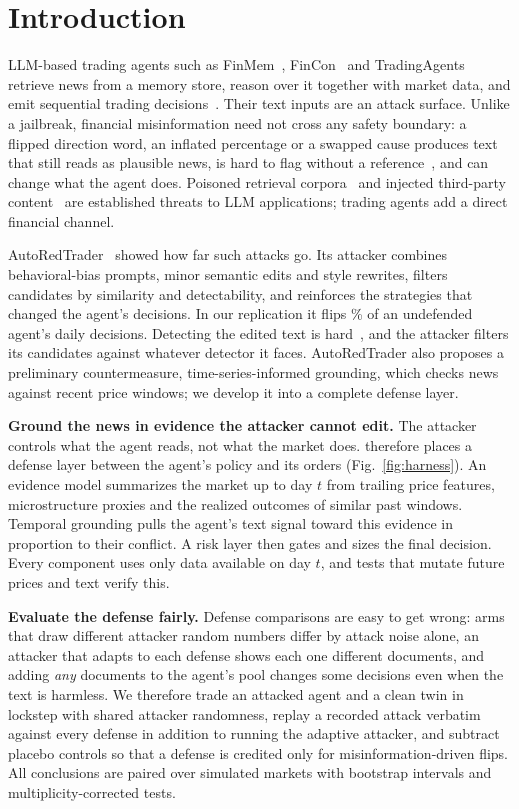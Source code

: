 \section{Introduction}\label{sec:intro}
LLM-based trading agents such as FinMem~\cite{yu2025finmem}, FinCon~\cite{yu2024fincon} and TradingAgents~\cite{xiao2025tradingagents} retrieve news from a memory store, reason over it together with market data, and emit sequential trading decisions~\cite{li2025investorbench,zhang2024finagent}. Their text inputs are an attack surface. Unlike a jailbreak, financial misinformation need not cross any safety boundary: a flipped direction word, an inflated percentage or a swapped cause produces text that still reads as plausible news, is hard to flag without a reference~\cite{jiang2026glisters}, and can change what the agent does. Poisoned retrieval corpora~\cite{zou2025poisonedrag} and injected third-party content~\cite{greshake2023indirect} are established threats to LLM applications; trading agents add a direct financial channel.

AutoRedTrader~\cite{liu2026autoredtrader} showed how far such attacks go. Its attacker combines behavioral-bias prompts, minor semantic edits and style rewrites, filters candidates by similarity and detectability, and reinforces the strategies that changed the agent's decisions. In our replication it flips \% of an undefended agent's daily decisions. Detecting the edited text is hard~\cite{jiang2026glisters,wang2026life}, and the attacker filters its candidates against whatever detector it faces. AutoRedTrader also proposes a preliminary countermeasure, time-series-informed grounding, which checks news against recent price windows; we develop it into a complete defense layer.

\textbf{Ground the news in evidence the attacker cannot edit.} The attacker controls what the agent reads, not what the market does. \rhal{} therefore places a defense layer between the agent's policy and its orders (Fig.~\ref{fig:harness}). An evidence model summarizes the market up to day $t$ from trailing price features, microstructure proxies and the realized outcomes of similar past windows. Temporal grounding pulls the agent's text signal toward this evidence in proportion to their conflict. A risk layer then gates and sizes the final decision. Every component uses only data available on day $t$, and tests that mutate future prices and text verify this.

\textbf{Evaluate the defense fairly.} Defense comparisons are easy to get wrong: arms that draw different attacker random numbers differ by attack noise alone, an attacker that adapts to each defense shows each one different documents, and adding \emph{any} documents to the agent's pool changes some decisions even when the text is harmless. We therefore trade an attacked agent and a clean twin in lockstep with shared attacker randomness, replay a recorded attack verbatim against every defense in addition to running the adaptive attacker, and subtract placebo controls so that a defense is credited only for misinformation-driven flips. All conclusions are paired over  simulated markets with bootstrap intervals and multiplicity-corrected tests.

